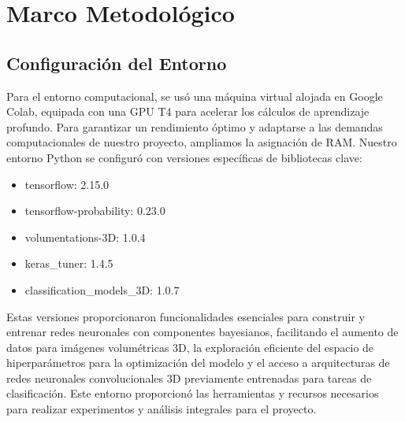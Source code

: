 \documentclass[10pt, oneside, a4paper]{article}
\begin{document}
	
	

	
	

	\section{Marco Metodológico} \label{marco_metodologia}
	
	\subsection{Configuración del Entorno} \label{entorno}
	
	Para el entorno computacional, se usó una máquina virtual alojada en Google Colab, equipada con una GPU T4 para acelerar los cálculos de aprendizaje profundo. Para garantizar un rendimiento óptimo y adaptarse a las demandas computacionales de nuestro proyecto, ampliamos la asignación de RAM. Nuestro entorno Python se configuró con versiones específicas de bibliotecas clave:
	
	\begin{itemize}
		\item tensorflow: 2.15.0
		\item tensorflow-probability: 0.23.0
		\item volumentations-3D: 1.0.4
		\item keras\_tuner: 1.4.5
		\item classification\_models\_3D: 1.0.7
	\end{itemize}
	
	Estas versiones proporcionaron funcionalidades esenciales para construir y entrenar redes neuronales con componentes bayesianos, facilitando el aumento de datos para imágenes volumétricas 3D, la exploración eficiente del espacio de hiperparámetros para la optimización del modelo y el acceso a arquitecturas de redes neuronales convolucionales 3D previamente entrenadas para tareas de clasificación. Este entorno proporcionó las herramientas y recursos necesarios para realizar experimentos y análisis integrales para el proyecto.
\end{document}
